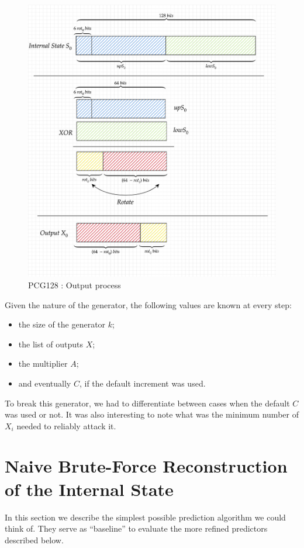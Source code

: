 \documentclass[preprint]{iacrtrans}
\begin{document}
\begin{figure}[h!]
    \centering
    \includegraphics[width=0.75\linewidth]{pictures/PCG128.png}
    \caption{PCG128 : Output process}
    \label{pcg128out}
\end{figure}



Given the nature of the generator, the following values are known at every step:
\begin{itemize}
    \item the size of the generator $k$;
    \item the list of outputs $X$;
    \item the multiplier $A$;
    \item and eventually $C$, if the default increment was used. 
\end{itemize}

To break this generator, we had to differentiate between cases when the default $C$ was used or not. It was also interesting to note what was the minimum number of $X_i$ needed to reliably attack it.




\section{Naive Brute-Force Reconstruction of the Internal State}

In this section we describe the simplest possible prediction algorithm we could
think of. They serve as ``baseline'' to evaluate the more refined predictors
described below.
\end{document}
